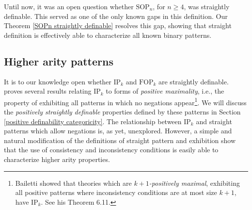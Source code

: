\documentclass{article}
\newcommand{\SOPn}{$\text{SOP}_n$}
\theoremstyle{definition}
\theoremstyle{definition}
\theoremstyle{definition}
\begin{document}
Until now, it was an open question whether \SOPn, for $n\geq 4$, was straightly definable. This served as one of the only known gaps in this definition. Our Theorem \ref{SOPn straightly definable} resolves this gap, showing that straight definition is effectively able to characterize all known binary patterns. 


\subsection{Higher arity patterns}\label{higher arity straight defn section}

It is to our knowledge open whether $\text{IP}_k$ and $\text{FOP}_k$ are straightly definable. \cite{bailetti2024walk} proves several results relating $\text{IP}_k$ to forms of \textit{positive maximality}, i.e., the property of exhibiting all patterns in which no negations appear\footnote{Bailetti showed that theories which are $k+1$\textit{-positively maximal}, exhibiting all positive patterns where inconsistency conditions are at most size $k+1$, have $\text{IP}_k$. See his Theorem 6.11.}. We will discuss the  \textit{positively straightly definable} properties defined by these patterns in Section \ref{positive definability categoricity}. The relationship between $\text{IP}_k$ and straight patterns which allow negations is, as yet, unexplored. However, a simple and natural modification of the definitions of straight pattern and exhibition show that the use of consistency and inconsistency conditions is easily able to characterize higher arity properties.


\end{document}
